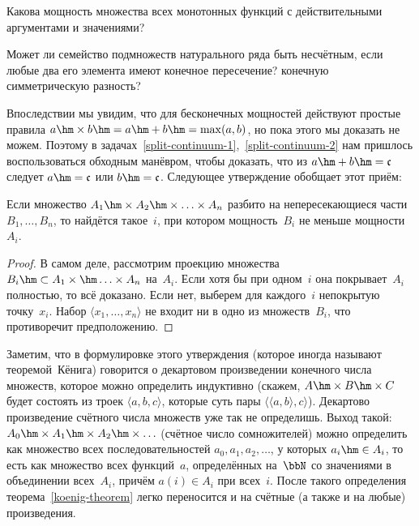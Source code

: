 \begin{problem}
Какова мощность множества всех монотонных функций с
действительными аргументами и значениями?
\end{problem}

\begin{problem}
Может ли семейство подмножеств натурального ряда быть
несчётным, если любые два его элемента имеют конечное
пересечение? конечную симметрическую разность?
\end{problem}

\problskip
Впоследствии мы увидим, что для бесконечных мощностей действуют
простые правила $a\hm\times b \hm= a\hm+b \hm= \max(a,b)$, но
пока этого мы доказать не можем. Поэтому в
задачах~\ref{split-continuum-1},~\ref{split-continuum-2} нам
пришлось воспользоваться обходным манёвром, чтобы доказать, что
из $a\hm+b\hm=\mathfrak{c}$ следует $a\hm=\mathfrak{c}$ или
$b\hm=\mathfrak{c}$. Следующее утверждение обобщает этот приём:

\begin{theorem}\label{koenig-theorem}
Если множество
$A_1\hm\times A_2\hm\times\ldots\times A_n$ разбито на непересекающиеся
части $B_1, \dots, B_n$, то найдётся такое~$i$, при котором
мощность~$B_i$ не меньше мощности~$A_i$.
\end{theorem}

\begin{proof}
В самом деле, рассмотрим проекцию множества $B_i\hm\subset
A_1\times\hm\ldots\times A_n$ на~$A_i$. Если хотя бы при одном~$i$
она покрывает~$A_i$ полностью, то всё доказано. Если нет,
выберем для каждого~$i$ непокрытую точку~$x_i$. Набор $\langle
x_1,\dots,x_n\rangle$ не входит ни в одно из множеств~$B_i$, что
противоречит предположению.
\end{proof}

Заметим, что в формулировке этого утверждения (которое иногда
называют теоремой~Кёнига)
говорится о декартовом
произведении конечного числа множеств, которое можно определить
индуктивно (скажем, $A\hm\times B\hm\times C$ будет состоять из
троек $\langle a,b,c\rangle$, которые суть пары $\langle \langle
a,b\rangle,c\rangle$). Декартово произведение счётного числа
множеств уже так не определишь. Выход такой:
$A_0\hm\times A_1\hm\times A_2 \hm\times\ldots$ (счётное число
сомножителей) можно определить
как множество всех
последовательностей $a_0, a_1, a_2, \dots$, у которых $a_i\hm\in
A_i$, то есть как множество всех функций~$a$, определённых на~$\bbN$
со значениями в объединении всех~$A_i$, причём
$a(i)\in A_i$ при всех~$i$. После такого определения
теорема~\ref{koenig-theorem} легко переносится и на счётные
(а также и на любые) произведения.

